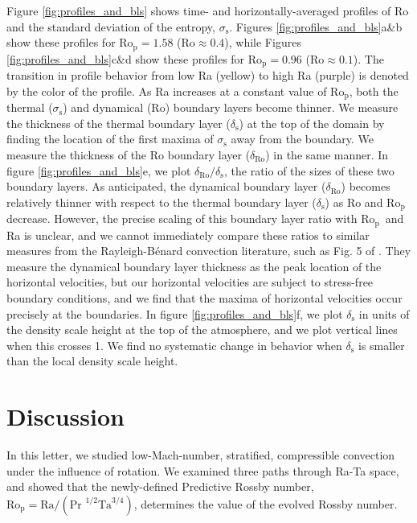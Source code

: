 \documentclass[twocolumn, amsmath, amsfonts, amssymb, trackchanges]{aastex62}
\newcommand{\RB}{Rayleigh-B\'{e}nard }
\newcommand{\pro}{\ensuremath{\text{Ro}_{\text{p}}}}
\begin{document}
Figure \ref{fig:profiles_and_bls} shows time- and horizontally-averaged profiles of
Ro and the standard deviation of the entropy, $\sigma_{\text{s}}$.
Figures \ref{fig:profiles_and_bls}a\&b show these profiles for $\pro=1.58$ ($\text{Ro} \approx 0.4$), while
Figures \ref{fig:profiles_and_bls}c\&d show these profiles for $\pro=0.96$ ($\text{Ro} \approx 0.1$). The transition
in profile behavior from low Ra (yellow) to high Ra (purple) is denoted by the color of the
profile.
As Ra increases at a constant value of
\pro, both the thermal ($\sigma_{\text{s}}$) and dynamical (Ro) boundary layers become thinner. 
We measure the
thickness of the thermal boundary layer ($\delta_{\text{s}}$) at the top of the domain by 
finding the location of the first maxima of $\sigma_{\text{s}}$ away from the boundary.
We measure
the thickness of the Ro boundary layer ($\delta_{\text{Ro}}$) 
in the same manner.
In figure \ref{fig:profiles_and_bls}e, we plot $\delta_{\text{Ro}}/\delta_{\text{s}}$, the ratio
of the sizes of these two boundary layers. As anticipated, the dynamical boundary layer ($\delta_{\text{Ro}}$)
becomes relatively thinner with respect to the thermal boundary layer ($\delta_{\text{s}}$)
as Ro and \pro$\,$ decrease. 
However, the precise scaling of this boundary layer ratio with \pro$\,$ and Ra is unclear, 
and we cannot immediately compare these ratios to similar measures from the \RB convection
literature, such as Fig. 5 of \cite{king&all2013}. They measure the dynamical boundary layer
thickness as the peak location of the horizontal velocities, but our horizontal velocities
are subject to stress-free boundary conditions, and we find that the maxima of horizontal 
velocities occur precisely at the boundaries.
In figure \ref{fig:profiles_and_bls}f, we plot $\delta_\text{s}$ in units of the density
scale height at the top of the atmosphere, and we plot vertical lines when this crosses 1.
We find no systematic change in behavior when $\delta_{\text{s}}$ is smaller than the
local density scale height.

\section{Discussion}
\label{sec:discussion}
In this letter, we studied low-Mach-number, stratified, compressible convection 
under the influence of rotation.
We examined three paths through Ra-Ta space, and showed that the newly-defined 
Predictive Rossby number, $\pro = \text{Ra}/(\text{Pr }^{1/2}\text{Ta}^{3/4})$, determines the value of
the evolved Rossby number. 
\end{document}
